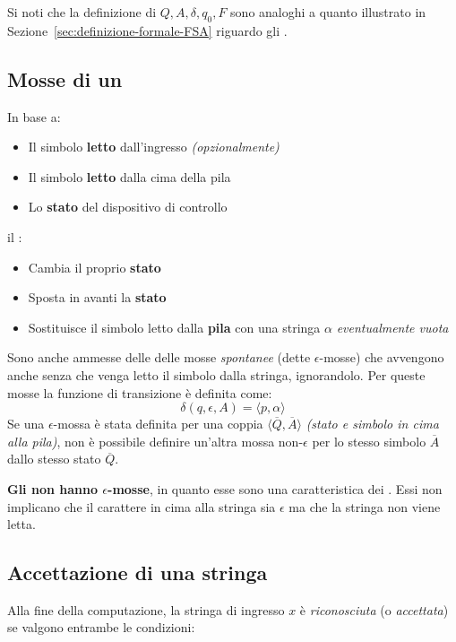 \documentclass[italian, 10pt]{article}
\begin{document}
Si noti che la definizione di \(Q, A, \delta, q_0, F\) sono analoghi a quanto illustrato in Sezione~\ref{sec:definizione-formale-FSA} riguardo gli \FSA.

\subsection{Mosse di un \PDA}

In base a:

\begin{itemize}
  \item Il simbolo \textbf{letto} dall'ingresso \textit{(opzionalmente)}
  \item Il simbolo \textbf{letto} dalla cima della pila
  \item Lo \textbf{stato} del dispositivo di controllo
\end{itemize}

il \PDA:

\begin{itemize}
  \item Cambia il proprio \textbf{stato}
  \item Sposta in avanti la \textbf{stato}
  \item Sostituisce il simbolo letto dalla \textbf{pila} con una stringa \(\alpha\) \textit{eventualmente vuota}
\end{itemize}

Sono anche ammesse delle delle mosse \textit{spontanee} (dette \(\epsilon\)-mosse) che avvengono anche senza che venga letto il simbolo dalla stringa, ignorandolo.
Per queste mosse la funzione di transizione è definita come:
\[ \delta(q, \epsilon, A) = \langle p, \alpha \rangle \]
Se una \(\epsilon\)-mossa è stata definita per una coppia \(\langle \overline{Q}, \overline{A} \rangle\) \textit{(stato e simbolo in cima alla pila)}, non è possibile definire un'altra mossa non-\(\epsilon\) per lo stesso simbolo \(\overline{A}\) dallo stesso stato \(\overline{Q}\).

\textbf{Gli \FSA non hanno \(\epsilon\)-mosse}, in quanto esse sono una caratteristica dei \PDA.
Essi non implicano che il carattere in cima alla stringa sia \(\epsilon\) ma che la stringa non viene letta.

\subsection{Accettazione di una stringa}

Alla fine della computazione, la stringa di ingresso \(x\) è \textit{riconosciuta} (o \textit{accettata}) se valgono entrambe le condizioni:
\end{document}
